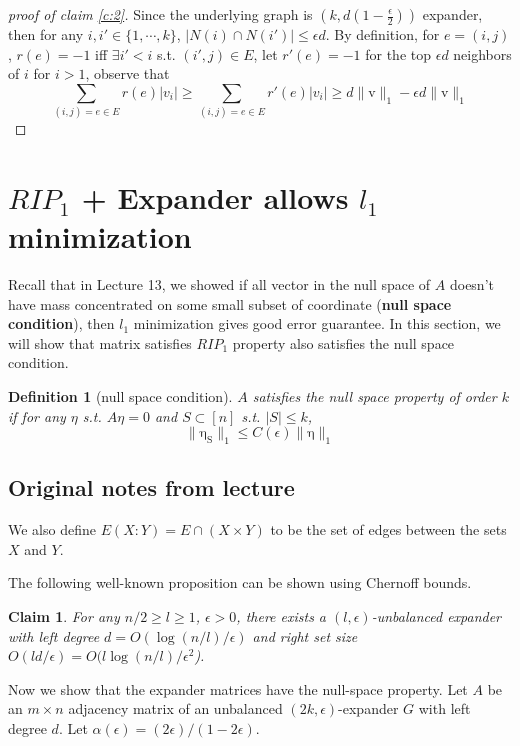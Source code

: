 \documentclass[11pt]{article}
\newtheorem{definition}[theorem]{Definition}
\newtheorem{claim}[theorem]{Claim}
\newcommand{\lpnorm}[2]{\operatorname{\|{#1}\|_{#2}}}
\begin{document}
\begin{proof} [proof of claim \ref{c:2}]
Since the underlying graph is $(k, d(1 - \frac{\epsilon}{2}))$ expander, then for any $i, i' \in \{1, \cdots, k\}$, $|N(i) \cap N(i')| \leq \epsilon d$. By definition, for $e = (i, j)$, $r(e) = -1$ iff $\exists i' < i$ s.t. $(i', j) \in E$, let $r'(e) = -1$ for the top $\epsilon d$ neighbors of $i$ for $i > 1$, observe that
\[\sum_{(i, j) = e \in E}r(e)|v_i| \geq \sum_{(i, j) = e \in E}r'(e)|v_i| \geq d\lpnorm{v}{1} - \epsilon d \lpnorm{v}{1}\]
\end{proof}
\section{$RIP_1$ + Expander allows $l_1$ minimization}
Recall that in Lecture 13, we showed if all vector in the null space of $A$ doesn't have mass concentrated on some small subset of coordinate (\textbf{null space condition}), then $l_1$ minimization gives good error guarantee. In this section, we will show that matrix satisfies $RIP_1$ property also satisfies the null space condition. 

\begin{definition}[null space condition]
$A$ satisfies the null space property of order $k$ if for any $\eta$ s.t. $A \eta = 0$ and $S \subset [n]$ s.t. $|S| \leq k$,
\[\lpnorm{\eta_S}{1} \leq C(\epsilon) \lpnorm{\eta}{1}\]
\end{definition}

\subsection{Original notes from lecture}
We also define $E(X:Y)= E \cap (X \times Y)$ to be the set of edges between the sets $X$ and $Y$.
 
The following well-known proposition can be shown using Chernoff bounds.

\begin{claim}
\em For any $n/2 \ge l \ge 1$, $\epsilon>0$, there exists a $(l,\epsilon)$-unbalanced expander with left degree $d=O(\log(n/l)/\epsilon)$ and right set size $O(ld/\epsilon)= O(l \log(n/l)/\epsilon^2$). 
\end{claim}

Now we show that the expander matrices have the null-space property.
Let $A$ be an $m \times n$ adjacency matrix of an unbalanced $(2k,\epsilon)$-expander $G$ with left degree $d$.
Let $\alpha(\epsilon)=(2 \epsilon)/(1-2\epsilon)$.
\end{document}
